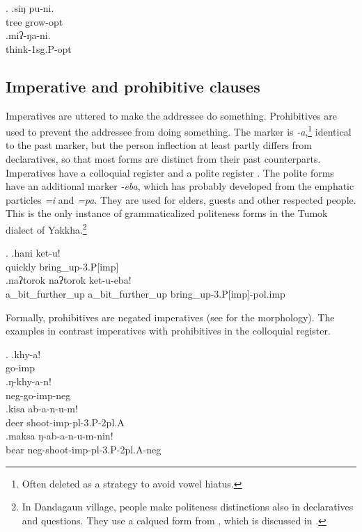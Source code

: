 \largerpage

  \ex. \ag.siŋ pu-ni.\\
  tree grow{\sc [3sg]-opt}\\
  \bg.miʔ-ŋa-ni.\\
  think{\sc -1sg.P-opt}\\
 
\subsection{Imperative and prohibitive clauses}

Imperatives are uttered to make the addressee do something. Prohibitives are used to prevent the addressee from doing something. The  marker is \emph{-a},\footnote{Often deleted as a strategy to avoid vowel hiatus.} identical to the past marker, but the person inflection at least partly differs from declaratives, so that most forms are distinct from their past counterparts. Imperatives have a colloquial register \Next[a] and a polite register \Next[b]. The polite forms have an additional marker \emph{-eba}, which has probably developed from the emphatic particles \emph{=i} and \emph{=pa}. They are used for elders, guests and other respected people. This is the only instance of grammaticalized politeness forms in the Tumok dialect of Yakkha.\footnote{In Dandagaun village, people make politeness distinctions also in declaratives and questions. They use a calqued form from , which is discussed in .} 

\ex. \ag.hani ket-u!\\
quickly bring\_up{\sc -3.P[imp]}\\
\bg.naʔtorok naʔtorok ket-u-eba!\\
a\_bit\_further\_up a\_bit\_further\_up  bring\_up{\sc -3.P[imp]-pol.imp}\\

Formally, prohibitives are  negated imperatives (see  for the morphology). The examples in \Next contrast  imperatives with prohibitives in the colloquial register.

\ex. \ag.khy-a!\\
go{\sc -imp}\\
\bg.ŋ-khy-a-n!\\
{\sc neg-}go{\sc -imp-neg}\\
\bg.kisa ab-a-n-u-m!\\
deer shoot{\sc -imp-pl-3.P-2pl.A}\\
\bg.maksa ŋ-ab-a-n-u-m-nin!\\
bear {\sc neg-}shoot{\sc -imp-pl-3.P-2pl.A-neg}\\

